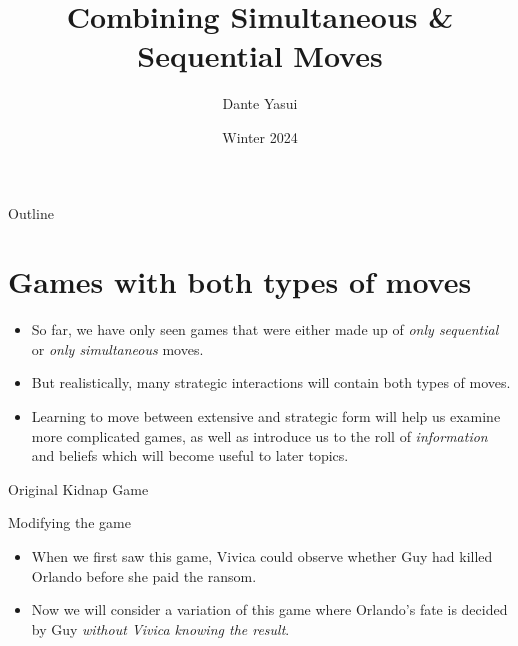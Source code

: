 \documentclass{beamer}
\title{Combining Simultaneous \& Sequential Moves}
\author{Dante Yasui}
\date{Winter 2024}
\theoremstyle{plain}
\begin{document}
\begin{frame}[plain]
    \titlepage
\end{frame}
\addtocounter{framenumber}{-1}

\begin{frame}{Outline}
  \tableofcontents
\end{frame}

\section{Games with both types of moves}

\begin{frame}
  \begin{itemize}

    \item So far, we have only seen games that were either made up of 
    \textit{only sequential} or \textit{only simultaneous} moves.

    \item But realistically, 
    many strategic interactions will contain both types of moves.

    \item Learning to move between extensive and strategic form 
    will help us examine more complicated games,
    as well as introduce us to the roll of \textit{information} and beliefs
    which will become useful to later topics.

  \end{itemize}
\end{frame}


\begin{frame}{Original Kidnap Game}
  \begin{center}
    
  \end{center}
\end{frame}


\begin{frame}{Modifying the game}
  \begin{itemize}

    \item When we first saw this game,
    Vivica could observe whether Guy had killed Orlando before she paid the ransom. 

    \item Now we will consider a variation of this game 
    where Orlando's fate is decided by Guy 
    \textit{without Vivica knowing the result}.

  \end{itemize}
\end{frame}
\end{document}
